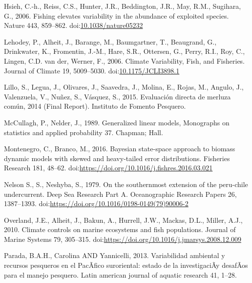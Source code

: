 \documentclass[12pt]{article}
\begin{document}
\leavevmode\hypertarget{ref-Hsieh:2006aa}{}%
Hsieh, C.-h., Reiss, C.S., Hunter, J.R., Beddington, J.R., May, R.M.,
Sugihara, G., 2006. Fishing elevates variability in the abundance of
exploited species. Nature 443, 859--862.
doi:\href{https://doi.org/10.1038/nature05232}{10.1038/nature05232}

\leavevmode\hypertarget{ref-Lehodey2006}{}%
Lehodey, P., Alheit, J., Barange, M., Baumgartner, T., Beaugrand, G.,
Drinkwater, K., Fromentin, J.-M., Hare, S.R., Ottersen, G., Perry, R.I.,
Roy, C., Lingen, C.D. van der, Werner, F., 2006. Climate Variability,
Fish, and Fisheries. Journal of Climate 19, 5009--5030.
doi:\href{https://doi.org/10.1175/JCLI3898.1}{10.1175/JCLI3898.1}

\leavevmode\hypertarget{ref-Lilloetal2015}{}%
Lillo, S., Legua, J., Olivares, J., Saavedra, J., Molina, E., Rojas, M.,
Angulo, J., Valenzuela, V., Nuñez, S., Vásquez, S., 2015. Evaluación
directa de merluza común, 2014 (Final Report). Instituto de Fomento
Pesquero.

\leavevmode\hypertarget{ref-McCullaghNelder1989}{}%
McCullagh, P., Nelder, J., 1989. Generalized linear models, Monographs
on statistics and applied probability 37. Chapman; Hall.

\leavevmode\hypertarget{ref-MONTENEGRO201648}{}%
Montenegro, C., Branco, M., 2016. Bayesian state-space approach to
biomass dynamic models with skewed and heavy-tailed error distributions.
Fisheries Research 181, 48--62.
doi:\href{https://doi.org/https://doi.org/10.1016/j.fishres.2016.03.021}{https://doi.org/10.1016/j.fishres.2016.03.021}

\leavevmode\hypertarget{ref-S19791387}{}%
Nelson S., S., Neshyba, S., 1979. On the southernmost extension of the
peru-chile undercurrent. Deep Sea Research Part A. Oceanographic
Research Papers 26, 1387--1393.
doi:\href{https://doi.org/https://doi.org/10.1016/0198-0149(79)90006-2}{https://doi.org/10.1016/0198-0149(79)90006-2}

\leavevmode\hypertarget{ref-OVERLAND2010305}{}%
Overland, J.E., Alheit, J., Bakun, A., Hurrell, J.W., Mackas, D.L.,
Miller, A.J., 2010. Climate controls on marine ecosystems and fish
populations. Journal of Marine Systems 79, 305--315.
doi:\href{https://doi.org/https://doi.org/10.1016/j.jmarsys.2008.12.009}{https://doi.org/10.1016/j.jmarsys.2008.12.009}

\leavevmode\hypertarget{ref-PARADA2013}{}%
Parada, B.A.H., Carolina AND Yannicelli, 2013. Variabilidad ambiental y
recursos pesqueros en el PacÃfico suroriental: estado de la
investigaciÃy desafÃos para el manejo pesquero. Latin american journal
of aquatic research 41, 1--28.
\end{document}
